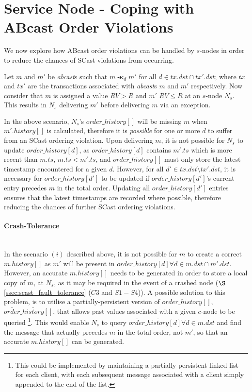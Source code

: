 \section{Service Node - Coping with \textsf{ABcast} Order Violations}
We now explore how \textsf{ABcast} order violations can be handled by $s$-nodes in order to reduce the chances of \textsf{SCast} violations from occurring.  

Let $m$ and $m'$ be \emph{abcast}s such that $m \llcurly_d m'$ for all $d \in tx.dst \cap tx'.dst$; where $tx$ and $tx'$ are the transactions associated with \emph{abcast}s $m$ and $m'$ respectively.  Now consider that $m$ is assigned a value $RV > R$ and $m'$ $RV \leq R$ at an $s$-node $N_s$.  This results in $N_s$ delivering $m'$ before delivering $m$ via an exception.
    
    In the above scenario, $N_s$'s $order\_history[]$ will be missing $m$ when $m'.history[]$ is calculated, therefore it is \emph{possible} for one or more $d$ to suffer from an SCast ordering violation.  Upon delivering $m$, it is not possible for $N_s$ to update $order\_history[d]$, as $order\_history[d]$ contains $m'.ts$ which is more recent than $m.ts$, $m.ts < m'.ts$, and $order\_history[]$ must only store the latest timestamp encountered for a given $d$.  However, for all $d' \in tx.dst \setminus tx'.dst$, it is necessary for $order\_history[d']$ to be updated if $order\_history[d']$'s current entry precedes $m$ in the total order.  Updating all $order\_history[d']$ entries ensures that the latest timestamps are recorded where possible, therefore reducing the chances of further SCast ordering violations.  
    
    \paragraph{Crash-Tolerance} \hfill \\
    In the scenario $(i)$ described above, it is not possible for $m$ to create a correct $m.history[]$ as $m'$ will be present in $order\_history[d] \forall d \in m.dst \cap m'.dst$.  However, an accurate $m.history[]$ needs to be generated in order to store a local copy of $m$, at $N_s$, as it may be required in the event of a crashed node ($\S$ \ref{ssec:scast_fault_tolerance} ($C3$ and $S1-S4$)).  A possible solution to this problem, is to utilise a partially-persistent version of $order\_history[]$, $\bar{order}\_\bar{history}[]$, that allows past values associated with a given $c$-node to be queried \footnote{This could be implemented by maintaining a partially-persistent linked list for each client, with each subsequent message associated with a client simply appended to the end of the list.}.  This would enable $N_s$ to query $\bar{order}\_\bar{history}[d] \forall d \in m.dst$ and find the message that actually precedes $m$ in the total order, not $m'$, so that an accurate $m.history[]$ can be generated.
    
